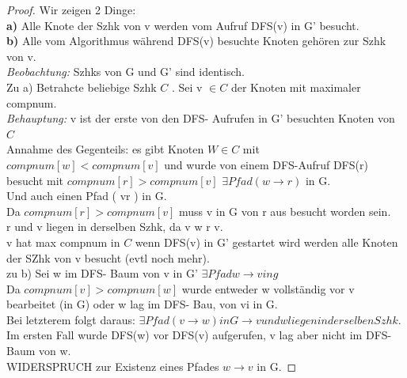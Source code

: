 \documentclass{article}
\begin{document}
\begin{proof}
    Wir zeigen 2 Dinge: \\
    \textbf{a)} Alle Knote der Szhk von v werden vom Aufruf DFS(v) in G' besucht. \\
    \textbf{b)} Alle vom Algorithmus während DFS(v) besuchte Knoten gehören zur Szhk von v. \\

    \textit{Beobachtung: } Szhks von G und G' sind identisch.\\
    \newline
    Zu a) Betrahcte beliebige Szhk  $ C $ . Sei v  $ \in C$ der Knoten mit maximaler compnum. \\
    \textit{Behauptung: } v ist der erste von den DFS- Aufrufen in G' besuchten Knoten von $C$ \\
    Annahme des Gegenteils: es gibt Knoten $ W \in C$ mit $compnum[w] < compnum[v] $ und wurde von einem DFS-Aufruf DFS(r) besucht mit $compnum[r] > compnum[v] $ \rightarrow $ \exists Pfad ( w \rightarrow r) $ in G. \\
    Und auch einen Pfad ( v\rightarrow r ) in G. \\
    Da $ compnum[r] > compnum [v]$ muss v in G von r aus besucht worden sein.\\
    \rightarrow r und v liegen in derselben Szhk, da v \rightarrow w \rightarrow r \rightarrow v. \\
    \newline
    v hat max compnum in $C$ \rightarrow wenn DFS(v) in G'  gestartet wird werden alle Knoten der SZhk von v besucht (evtl noch mehr). \\
\newline
    zu b) Sei w im DFS- Baum von v in G' \rightarrow $ \exists Pfad w \rightarrow v in g$ \\
    Da $ compnum [v] > compnum [w] $ wurde entweder w vollständig vor v bearbeitet (in G) oder w lag im DFS- Bau, von vi in G. \\
    Bei letzterem folgt daraus: $ \exists Pfad (v \rightarrow w) in G \rightarrow v und w liegen in derselben Szhk$. \\
    Im ersten Fall wurde DFS(w) vor DFS(v) aufgerufen, v lag aber nicht im DFS-Baum von w. \\
    WIDERSPRUCH zur Existenz eines Pfades $ w \rightarrow v$ in G.
\end{proof}
\end{document}
